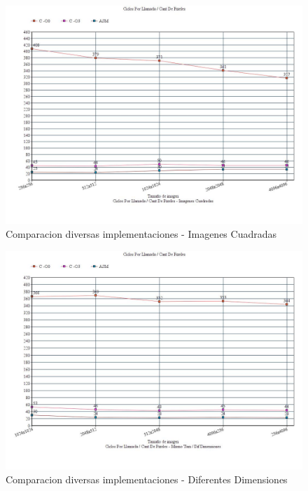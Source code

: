 \begin{figure}[h!]
\centering
\captionsetup{justification=centering}
	\includegraphics[width = 15 cm, height = 8 cm]{imagenes/ImgCuadradas.jpg}
	\caption[center]{Comparacion diversas implementaciones - Imagenes Cuadradas}
\end{figure}

\medskip
\begin{figure}[h!]
\centering
\captionsetup{justification=centering}
	\includegraphics[width = 15 cm, height = 8 cm]{imagenes/DifDimensiones.jpg}
	\caption[center]{Comparacion diversas implementaciones - Diferentes Dimensiones }
\end{figure}

\medskip

